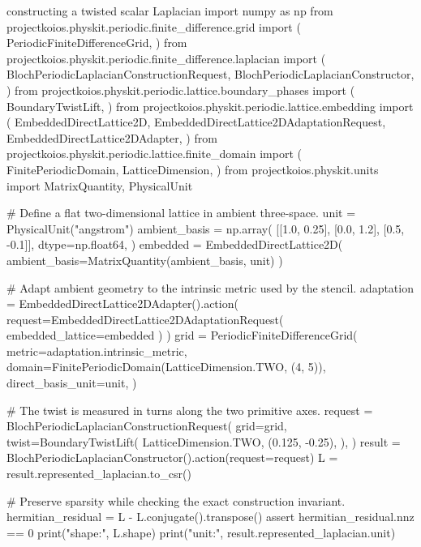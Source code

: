 \begin{pythonexample}{constructing a twisted scalar Laplacian}
import numpy as np
from projectkoios.physkit.periodic.finite_difference.grid import (
    PeriodicFiniteDifferenceGrid,
)
from projectkoios.physkit.periodic.finite_difference.laplacian import (
    BlochPeriodicLaplacianConstructionRequest,
    BlochPeriodicLaplacianConstructor,
)
from projectkoios.physkit.periodic.lattice.boundary_phases import (
    BoundaryTwistLift,
)
from projectkoios.physkit.periodic.lattice.embedding import (
    EmbeddedDirectLattice2D,
    EmbeddedDirectLattice2DAdaptationRequest,
    EmbeddedDirectLattice2DAdapter,
)
from projectkoios.physkit.periodic.lattice.finite_domain import (
    FinitePeriodicDomain,
    LatticeDimension,
)
from projectkoios.physkit.units import MatrixQuantity, PhysicalUnit

# Define a flat two-dimensional lattice in ambient three-space.
unit = PhysicalUnit("angstrom")
ambient_basis = np.array(
    [[1.0, 0.25], [0.0, 1.2], [0.5, -0.1]],
    dtype=np.float64,
)
embedded = EmbeddedDirectLattice2D(
    ambient_basis=MatrixQuantity(ambient_basis, unit)
)

# Adapt ambient geometry to the intrinsic metric used by the stencil.
adaptation = EmbeddedDirectLattice2DAdapter().action(
    request=EmbeddedDirectLattice2DAdaptationRequest(
        embedded_lattice=embedded
    )
)
grid = PeriodicFiniteDifferenceGrid(
    metric=adaptation.intrinsic_metric,
    domain=FinitePeriodicDomain(LatticeDimension.TWO, (4, 5)),
    direct_basis_unit=unit,
)

# The twist is measured in turns along the two primitive axes.
request = BlochPeriodicLaplacianConstructionRequest(
    grid=grid,
    twist=BoundaryTwistLift(
        LatticeDimension.TWO,
        (0.125, -0.25),
    ),
)
result = BlochPeriodicLaplacianConstructor().action(request=request)
L = result.represented_laplacian.to_csr()

# Preserve sparsity while checking the exact construction invariant.
hermitian_residual = L - L.conjugate().transpose()
assert hermitian_residual.nnz == 0
print("shape:", L.shape)
print("unit:", result.represented_laplacian.unit)
\end{pythonexample}


